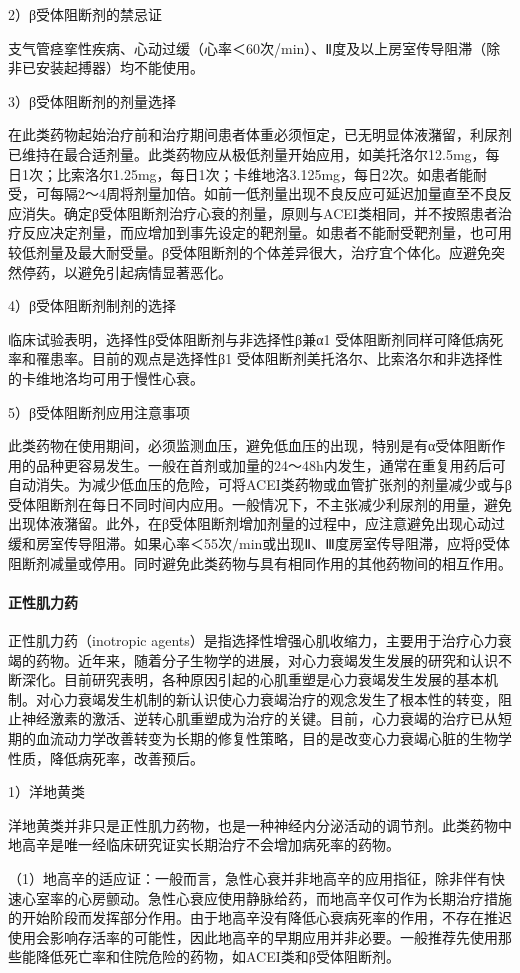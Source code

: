 2）β受体阻断剂的禁忌证

支气管痉挛性疾病、心动过缓（心率＜60次/min）、Ⅱ度及以上房室传导阻滞（除非已安装起搏器）均不能使用。

3）β受体阻断剂的剂量选择

在此类药物起始治疗前和治疗期间患者体重必须恒定，已无明显体液潴留，利尿剂已维持在最合适剂量。此类药物应从极低剂量开始应用，如美托洛尔12.5mg，每日1次；比索洛尔1.25mg，每日1次；卡维地洛3.125mg，每日2次。如患者能耐受，可每隔2～4周将剂量加倍。如前一低剂量出现不良反应可延迟加量直至不良反应消失。确定β受体阻断剂治疗心衰的剂量，原则与ACEI类相同，并不按照患者治疗反应决定剂量，而应增加到事先设定的靶剂量。如患者不能耐受靶剂量，也可用较低剂量及最大耐受量。β受体阻断剂的个体差异很大，治疗宜个体化。应避免突然停药，以避免引起病情显著恶化。

4）β受体阻断剂制剂的选择

临床试验表明，选择性β受体阻断剂与非选择性β兼α{1}
受体阻断剂同样可降低病死率和罹患率。目前的观点是选择性β{1}
受体阻断剂美托洛尔、比索洛尔和非选择性的卡维地洛均可用于慢性心衰。

5）β受体阻断剂应用注意事项

此类药物在使用期间，必须监测血压，避免低血压的出现，特别是有α受体阻断作用的品种更容易发生。一般在首剂或加量的24～48h内发生，通常在重复用药后可自动消失。为减少低血压的危险，可将ACEI类药物或血管扩张剂的剂量减少或与β受体阻断剂在每日不同时间内应用。一般情况下，不主张减少利尿剂的用量，避免出现体液潴留。此外，在β受体阻断剂增加剂量的过程中，应注意避免出现心动过缓和房室传导阻滞。如果心率＜55次/min或出现Ⅱ、Ⅲ度房室传导阻滞，应将β受体阻断剂减量或停用。同时避免此类药物与具有相同作用的其他药物间的相互作用。
\paragraph{正性肌力药}
正性肌力药（inotropic
agents）是指选择性增强心肌收缩力，主要用于治疗心力衰竭的药物。近年来，随着分子生物学的进展，对心力衰竭发生发展的研究和认识不断深化。目前研究表明，各种原因引起的心肌重塑是心力衰竭发生发展的基本机制。对心力衰竭发生机制的新认识使心力衰竭治疗的观念发生了根本性的转变，阻止神经激素的激活、逆转心肌重塑成为治疗的关键。目前，心力衰竭的治疗已从短期的血流动力学改善转变为长期的修复性策略，目的是改变心力衰竭心脏的生物学性质，降低病死率，改善预后。

1）洋地黄类

洋地黄类并非只是正性肌力药物，也是一种神经内分泌活动的调节剂。此类药物中地高辛是唯一经临床研究证实长期治疗不会增加病死率的药物。

（1）地高辛的适应证：一般而言，急性心衰并非地高辛的应用指征，除非伴有快速心室率的心房颤动。急性心衰应使用静脉给药，而地高辛仅可作为长期治疗措施的开始阶段而发挥部分作用。由于地高辛没有降低心衰病死率的作用，不存在推迟使用会影响存活率的可能性，因此地高辛的早期应用并非必要。一般推荐先使用那些能降低死亡率和住院危险的药物，如ACEI类和β受体阻断剂。

